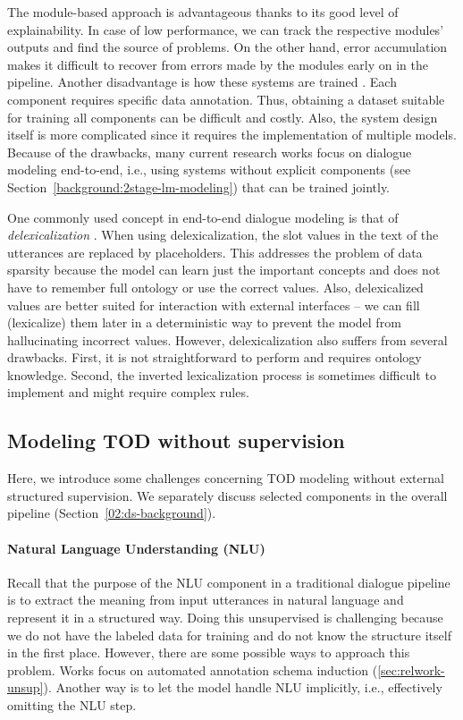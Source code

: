 The module-based approach is advantageous thanks to its good level of explainability.
In case of low performance, we can track the respective modules' outputs and find the source of problems.
On the other hand, error accumulation makes it difficult to recover from errors made by the modules early on in the pipeline.
Another disadvantage is how these systems are trained \cite{li-etal-2017-end}.
Each component requires specific data annotation.
Thus, obtaining a dataset suitable for training all components can be difficult and costly.
Also, the system design itself is more complicated since it requires the implementation of multiple models.
Because of the drawbacks, many current research works focus on dialogue modeling end-to-end, i.e., using systems without explicit components (see Section~\ref{background:2stage-lm-modeling}) that can be trained jointly.

\label{02:delex}
One commonly used concept in end-to-end dialogue modeling is that of \emph{delexicalization} \cite{wen-etal-2015-stochastic}.
When using delexicalization, the slot values in the text of the utterances are replaced by placeholders.
This addresses the problem of data sparsity because the model can learn just the important concepts and does not have to remember full ontology or use the correct values.
Also, delexicalized values are better suited for interaction with external interfaces -- we can fill (lexicalize) them later in a deterministic way to prevent the model from hallucinating incorrect values.
However, delexicalization also suffers from several drawbacks.
First, it is not straightforward to perform and requires ontology knowledge.
Second, the inverted lexicalization process is sometimes difficult to implement and might require complex rules.

\subsection{Modeling TOD without supervision}
\label{02:no-super}
Here, we introduce some challenges concerning TOD modeling without external structured supervision.
We separately discuss selected components in the overall pipeline (Section~\ref{02:ds-background}).

\paragraph{Natural Language Understanding (NLU)}
Recall that the purpose of the NLU component in a traditional dialogue pipeline is to extract the meaning from input utterances in natural language and represent it in a structured way.
Doing this unsupervised is challenging because we do not have the labeled data for training and do not know the structure itself in the first place.
However, there are some possible ways to approach this problem.
Works focus on automated annotation schema induction (\ref{sec:relwork-unsup}).
Another way is to let the model handle NLU implicitly, i.e., effectively omitting the NLU step.

